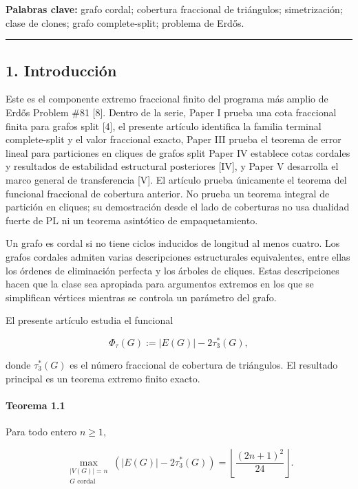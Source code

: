 \documentclass[spanish,11pt,a4paper]{article}
\begin{document}
\textbf{Palabras clave:} grafo cordal; cobertura fraccional de
triángulos; simetrización; clase de clones; grafo complete-split;
problema de Erdős.

\begin{center}\rule{0.5\linewidth}{0.5pt}\end{center}

\subsection{1. Introducción}\label{introducciuxf3n}

Este es el componente extremo fraccional finito del programa más amplio
de Erdős Problem \#81 {[}8{]}. Dentro de la serie, Paper I prueba una
cota fraccional finita para grafos split {[}4{]}, el presente artículo
identifica la familia terminal complete-split y el valor fraccional
exacto, Paper III prueba el teorema de error lineal para particiones en
cliques de grafos split Paper IV establece cotas cordales y resultados
de estabilidad estructural posteriores {[}IV{]}, y Paper V desarrolla el
marco general de transferencia {[}V{]}. El artículo prueba únicamente el
teorema del funcional fraccional de cobertura anterior. No prueba un
teorema integral de partición en cliques; su demostración desde el lado
de coberturas no usa dualidad fuerte de PL ni un teorema asintótico de
empaquetamiento.

Un grafo es cordal si no tiene ciclos inducidos de longitud al menos
cuatro. Los grafos cordales admiten varias descripciones estructurales
equivalentes, entre ellas los órdenes de eliminación perfecta y los
árboles de cliques. Estas descripciones hacen que la clase sea apropiada
para argumentos extremos en los que se simplifican vértices mientras se
controla un parámetro del grafo.

El presente artículo estudia el funcional

\[
\Phi_\tau(G):=|E(G)|-2\tau_3^*(G),
\]

donde \(\tau_3^*(G)\) es el número fraccional de cobertura de
triángulos. El resultado principal es un teorema extremo finito exacto.

\paragraph{Teorema 1.1}\label{teorema-1.1}

Para todo entero \(n\ge1\),

\[
\boxed{
\max_{\substack{|V(G)|=n\\G\text{ cordal}}}
\left(
|E(G)|-2\tau_3^*(G)
\right)
=
\left\lfloor\frac{(2n+1)^2}{24}\right\rfloor
}.
\]
\end{document}
